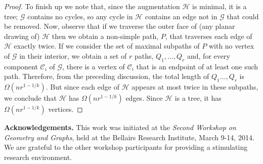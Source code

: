 \documentclass{patmorin}
\begin{document}
\begin{proof}
To finish up we note that, since the augmentation $\mathcal{H}$ is minimal,
it is a tree; $\mathcal G$ contains no cycles, so any cycle in $\mathcal H$ contains an edge not in $\mathcal G$ that could be removed.  Now, observe that if we traverse the outer face of (any planar drawing of) $\mathcal H$ then we obtain a non-simple path, $P$, that traverses each edge of $\mathcal{H}$ exactly twice. If we consider the set of maximal subpaths of $P$ with no vertex of $\mathcal G$ in their interior, we obtain a set of $r$ paths, $Q_1,\ldots,Q_{r}$ and, for every component $\mathcal C_i$ of $\mathcal G$, there is a vertex of $\mathcal C_i$ that is an endpoint of at least one such path.  Therefore, from the preceding discussion, the total length of $Q_1\ldots,Q_{r}$ is $\Omega(nr^{1-1/k})$.  But since each edge of $\mathcal H$ appears at most twice in these subpaths, we conclude that $\mathcal H$ has $\Omega(nr^{1-1/k})$ edges.  Since $\mathcal H$ is a tree, it has $\Omega(nr^{1-1/k})$ vertices.
\end{proof}

\textbf{Acknowledgements.}
This work was initiated at the \emph{Second Workshop on Geometry and Graphs},
held at the Bellairs Research Institute, March 9-14, 2014.  We are
grateful to the other workshop participants for providing a stimulating
research environment.

\newpage


\end{document}
